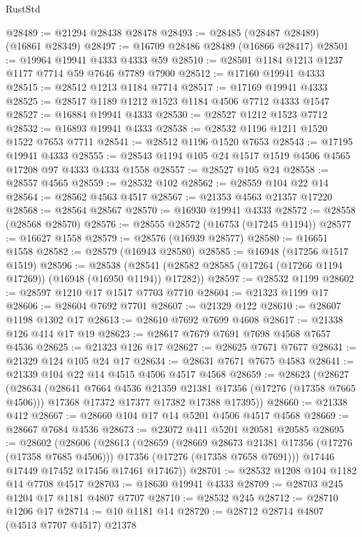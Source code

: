\begin{lexlean}{RustStd}
\begin{coremodule}
@28489 := @21294 @28438 @28478
@28493 := @28485 (@28487 @28489) (@16861 @28349)
@28497 := @16709 @28486 @28489 (@16866 @28417)
@28501 := @19964 @19941 @4333 @4333 @59
@28510 := @28501 @1184 @1213 @1237 @1177 @7714 @59 @7646 @7789 @7900
@28512 := @17160 @19941 @4333
@28515 := @28512 @1213 @1184 @7714
@28517 := @17169 @19941 @4333
@28525 := @28517 @1189 @1212 @1523 @1184 @4506 @7712 @4333 @1547
@28527 := @16884 @19941 @4333
@28530 := @28527 @1212 @1523 @7712
@28532 := @16893 @19941 @4333
@28538 := @28532 @1196 @1211 @1520 @1522 @7653 @7711
@28541 := @28512 @1196 @1520 @7653
@28543 := @17195 @19941 @4333
@28555 := @28543 @1194 @105 @24 @1517 @1519 @4506 @4565 @17208 @97 @4333 @4333 @1558
@28557 := @28527 @105 @24
@28558 := @28557 @4565
@28559 := @28532 @102
@28562 := @28559 @104 @22 @14
@28564 := @28562 @4563 @4517
@28567 := @21353 @4563 @21357 @17220
@28568 := @28564 @28567
@28570 := @16930 @19941 @4333
@28572 := @28558 (@28568 @28570)
@28576 := @28555 @28572 (@16753 (@17245 @1194))
@28577 := @16627 @1558
@28579 := @28576 (@16939 @28577)
@28580 := @16651 @1558
@28582 := @28579 (@16943 @28580)
@28585 := @16948 (@17256 @1517 @1519)
@28596 := @28538
    (@28541 (@28582 @28585 (@17264 (@17266 @1194 @17269)) (@16948 (@16950 @1194)) @17282))
@28597 := @28532 @1199
@28602 := @28597 @1210 @17 @1517 @7703 @7710
@28604 := @21323 @1199 @17
@28606 := @28604 @7692 @7701
@28607 := @21329 @122
@28610 := @28607 @1198 @1302 @17
@28613 := @28610 @7692 @7699 @4608
@28617 := @21338 @126 @414 @17 @19
@28623 := @28617 @7679 @7691 @7698 @4568 @7657 @4536
@28625 := @21323 @126 @17
@28627 := @28625 @7671 @7677
@28631 := @21329 @124 @105 @24 @17
@28634 := @28631 @7671 @7675 @4583
@28641 := @21339 @104 @22 @14 @4515 @4506 @4517 @4568
@28659 := @28623
    (@28627
      (@28634
        (@28641 @7664 @4536 @21359 @21381 @17356 (@17276 (@17358 @7665 @4506)))
        @17368
        @17372
        @17377
        @17382
        @17388
        @17395))
@28660 := @21338 @412
@28667 := @28660 @104 @17 @14 @5201 @4506 @4517 @4568
@28669 := @28667 @7684 @4536
@28673 := @23072 @411 @5201 @20581 @20585
@28695 := @28602
    (@28606
      (@28613
        (@28659
          (@28669 @28673 @21381 @17356 (@17276 (@17358 @7685 @4506)))
          @17356
          (@17276 (@17358 @7658 @7691)))
        @17446
        @17449
        @17452
        @17456
        @17461
        @17467))
@28701 := @28532 @1208 @104 @1182 @14 @7708 @4517
@28703 := @18630 @19941 @4333
@28709 := @28703 @245 @1204 @17 @1181 @4807 @7707
@28710 := @28532 @245
@28712 := @28710 @1206 @17
@28714 := @10 @1181 @14
@28720 := @28712 @28714 @4807 (@4513 @7707 @4517) @21378

\end{coremodule}
\end{lexlean}
